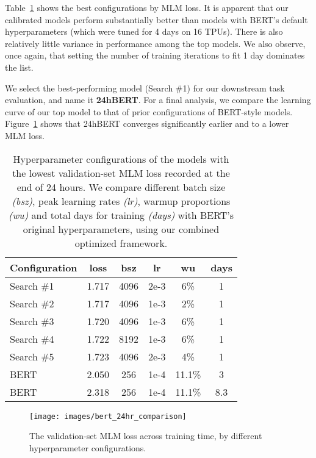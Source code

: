 \documentclass[11pt]{article}
\newcommand{\bertbase}{BERT }
\newcommand{\bertlarge}{BERT }
\begin{document}
Table~\ref{tab:best_24hr_configs} shows the best configurations by MLM loss.
It is apparent that our calibrated models perform substantially better than models with BERT's default hyperparameters (which were tuned for 4 days on 16 TPUs).
There is also relatively little variance in performance among the top models.
We also observe, once again, that setting the number of training iterations to fit 1 day dominates the list.

We select the best-performing model (Search \#1) for our downstream task evaluation, and name it \textbf{24hBERT}.
For a final analysis, we compare the learning curve of our top model to that of prior configurations of BERT-style models.
Figure~\ref{fig:bert_comparison_in_24hr} shows that 24hBERT converges significantly earlier and to a lower MLM loss.

\begin{table}[t]
\centering
\small
\begin{tabular}{@{}lccccc@{}}
\toprule
\textbf{Configuration} &
\bf loss &
\bf bsz &
\bf lr &
\bf wu &
\bf days \\
\midrule
Search \#1 & 1.717 & 4096 & 2e-3 & 6\% & 1 \\
Search \#2 & 1.717 & 4096 & 1e-3 & 2\% & 1 \\
Search \#3 & 1.720 & 4096 & 1e-3 & 6\% & 1 \\
Search \#4 & 1.722 & 8192 & 1e-3 & 6\% & 1 \\
Search \#5 & 1.723 & 4096 & 2e-3 & 4\% & 1 \\
\midrule
\bertbase{}   & 2.050 & 256 & 1e-4 & 11.1\% & 3 \\
\bertlarge{}  & 2.318 & 256 & 1e-4 & 11.1\% & 8.3 \\
\bottomrule
\end{tabular}
\caption{Hyperparameter configurations of the models with the lowest validation-set MLM loss recorded at the end of 24 hours. We compare different batch size \textit{(bsz)}, peak learning rates \textit{(lr)}, warmup proportions \textit{(wu)} and total days for training \textit{(days)} with BERT's original hyperparameters, using our combined optimized framework.
}
\label{tab:best_24hr_configs}
\end{table}
 
\begin{figure}
\centering
\texttt{[image: images/bert\_24hr\_comparison]}
\caption{The validation-set MLM loss across training time, by different hyperparameter configurations.}
\label{fig:bert_comparison_in_24hr}
\end{figure}
\end{document}
